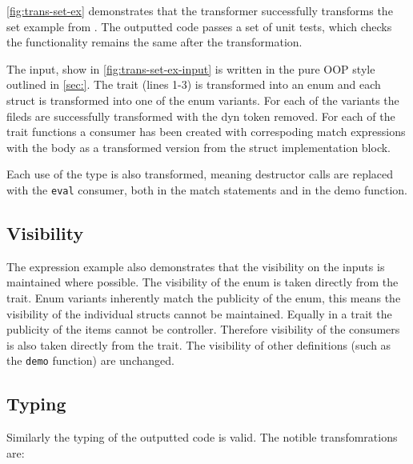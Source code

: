 \documentclass[ oneside,%
                    author={James Elgar},
                    degree={MEng},
                     title={Bidirectional transformer between functional and \\ object-oriented programming in Rust},
                  subtitle={}]{dissertation}
\newcommand{\rust}[1]{\texttt{#1}}
\begin{document}
\autoref{fig:trans-set-ex} demonstrates that the transformer successfully transforms the set example from \cite{food}. 
The outputted code passes a set of unit tests, which checks the functionality remains the same after the transformation.

The input, show in \autoref{fig:trans-set-ex-input} is written in the pure OOP style outlined in \autoref{sec:}. The trait (lines 1-3) is transformed into an enum and each struct is transformed into one of the enum variants. For each of the variants the fileds are successfully transformed with the dyn token removed. For each of the trait functions a consumer has been created with correspoding match expressions with the body as a transformed version from the struct implementation block.

Each use of the type is also transformed, meaning destructor calls are replaced with the \rust{eval} consumer, both in the match statements and in the demo function.


\subsection{Visibility}

The expression example also demonstrates that the visibility on the inputs is maintained where possible. The visibility of the enum is taken directly from the trait. Enum variants inherently match the publicity of the enum, this means the visibility of the individual structs cannot be maintained. Equally in a trait the publicity of the items cannot be controller. Therefore visibility of the consumers is also taken directly from the trait. The visibility of other definitions (such as the \rust{demo} function) are unchanged.

\subsection{Typing}

Similarly the typing of the outputted code is valid. The notible transfomrations are:
\end{document}
